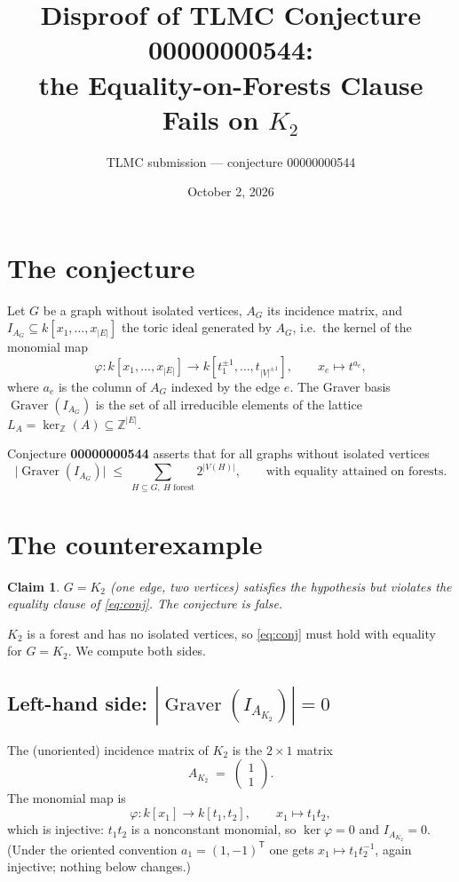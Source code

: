\documentclass[11pt]{article}
\title{Disproof of TLMC Conjecture 00000000544:\\ the Equality-on-Forests Clause Fails on $K_2$}
\author{TLMC submission --- conjecture 00000000544}
\date{October 2, 2026}
\newtheorem{claim}{Claim}
\newcommand{\Z}{\mathbb{Z}}
\newcommand{\Graver}{\operatorname{Graver}}
\begin{document}
\maketitle

\section{The conjecture}

Let $G$ be a graph without isolated vertices, $A_G$ its incidence matrix, and
$I_{A_G} \subseteq k[x_1,\dots,x_{|E|}]$ the toric ideal generated by $A_G$, i.e.\ the
kernel of the monomial map
\[
\varphi : k[x_1,\dots,x_{|E|}] \longrightarrow k[t_1^{\pm1},\dots,t_{|V|^{\pm1}}],
\qquad x_e \longmapsto t^{a_e},
\]
where $a_e$ is the column of $A_G$ indexed by the edge $e$. The Graver basis
$\Graver(I_{A_G})$ is the set of all irreducible elements of the lattice
$L_A = \ker_\Z(A) \subseteq \Z^{|E|}$.

Conjecture \textbf{00000000544} asserts that for all graphs without isolated vertices
\begin{equation}\label{eq:conj}
\bigl|\Graver(I_{A_G})\bigr| \;\le\; \sum_{H \subseteq G,\ H \text{ forest}} 2^{|V(H)|},
\qquad\text{with equality attained on forests.}
\end{equation}

\section{The counterexample}

\begin{claim}\label{clm:main}
$G = K_2$ (one edge, two vertices) satisfies the hypothesis but violates the equality
clause of \eqref{eq:conj}. The conjecture is false.
\end{claim}

$K_2$ is a forest and has no isolated vertices, so \eqref{eq:conj} must hold with
equality for $G = K_2$. We compute both sides.

\subsection{Left-hand side: $|\Graver(I_{A_{K_2}})| = 0$}

The (unoriented) incidence matrix of $K_2$ is the $2 \times 1$ matrix
\[
A_{K_2} \;=\; \begin{pmatrix} 1 \\ 1 \end{pmatrix}.
\]
The monomial map is
\[
\varphi : k[x_1] \to k[t_1, t_2], \qquad x_1 \mapsto t_1 t_2 ,
\]
which is injective: $t_1t_2$ is a nonconstant monomial, so
$\ker \varphi = 0$ and $I_{A_{K_2}} = 0$. (Under the oriented convention
$a_1 = (1,-1)^{\mathsf T}$ one gets $x_1 \mapsto t_1t_2^{-1}$, again injective; nothing
below changes.)
\end{document}
